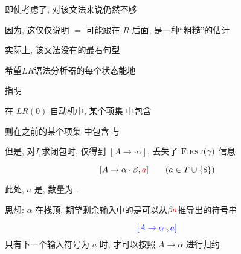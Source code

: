 \begin{frame}{}
  \begin{center}
    即使考虑了, 对该文法来说仍然不够

    \vspace{0.20cm}
    因为, 这仅仅说明 $=$ 可能跟在 $R$ 后面, 是一种``粗糙''的估计


    \pause
    实际上, 该文法没有的最右句型
  \end{center}
\end{frame}

\begin{frame}{}
  \begin{center}
    希望$LR$语法分析器的每个状态能地

    \vspace{0.30cm}
    指明

    \pause
    \vspace{1.00cm}
    在 $LR(0)$ 自动机中, 某个项集  中包含 

    \vspace{0.50cm}
    则在之前的某个项集  中包含 
    与 

    \vspace{0.50cm}

    \pause
    \vspace{0.80cm}
    但是, 对$I_{i}$求闭包时, 仅得到 $[A \to \cdot \alpha]$, 丢失了 $\textsc{First}(\gamma)$ 信息
  \end{center}
\end{frame}

\begin{frame}{}
  \begin{center}
    \begin{definition}[$LR(1)$项 (Item)]
      \[
        [A \to \alpha \cdot \beta, \textcolor{red}{a}] \qquad (a \in T \cup \{\$\})
      \]

      此处, $a$ 是, 数量为 .
    \end{definition}

    \pause
    \vspace{0.80cm}
    思想: $\alpha$ 在栈顶, 期望剩余输入中的是可以从$\beta \textcolor{red}{a}$推导出的符号串

    \pause
    \vspace{0.50cm}
    \[
      \textcolor{blue}{[A \to \alpha \cdot, a]}
    \]
    只有下一个输入符号为 $a$ 时, 才可以按照 $A \to \alpha$ 进行归约
  \end{center}
\end{frame}

